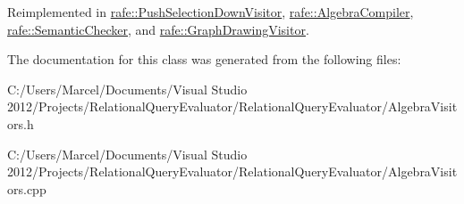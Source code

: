 Reimplemented in \hyperlink{classrafe_1_1_push_selection_down_visitor_aa46479b019c02a80571e1b676d1f0aea}{rafe\+::\+Push\+Selection\+Down\+Visitor}, \hyperlink{classrafe_1_1_algebra_compiler_a325833b8f33d540a299df55def890d12}{rafe\+::\+Algebra\+Compiler}, \hyperlink{classrafe_1_1_semantic_checker_a86d3f5970f8f0994411aef2410986a0c}{rafe\+::\+Semantic\+Checker}, and \hyperlink{classrafe_1_1_graph_drawing_visitor_a093a7d242525ae764e2790ea06c74a9e}{rafe\+::\+Graph\+Drawing\+Visitor}.



The documentation for this class was generated from the following files\+:\begin{DoxyCompactItemize}
\item 
C\+:/\+Users/\+Marcel/\+Documents/\+Visual Studio 2012/\+Projects/\+Relational\+Query\+Evaluator/\+Relational\+Query\+Evaluator/Algebra\+Visitors.\+h\item 
C\+:/\+Users/\+Marcel/\+Documents/\+Visual Studio 2012/\+Projects/\+Relational\+Query\+Evaluator/\+Relational\+Query\+Evaluator/Algebra\+Visitors.\+cpp\end{DoxyCompactItemize}
